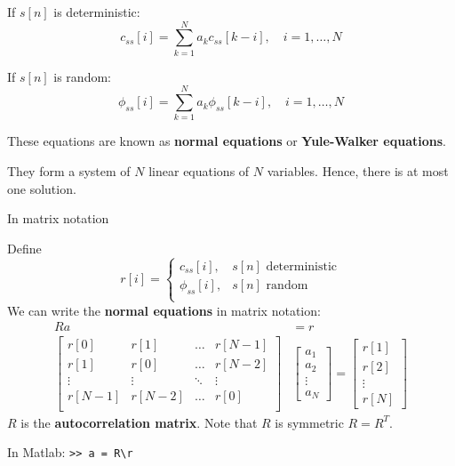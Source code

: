 \documentclass[10pt, aspectratio=169]{beamer}
\begin{document}
\begin{frame}
	If $s[n]$ is deterministic:
	\begin{equation*}
		c_{ss}[i] = \sum_{k = 1}^N a_kc_{ss}[k-i],  \quad i = 1, \ldots,N
	\end{equation*}
	
	
	If $s[n]$ is random: 
	\begin{equation*}
	\phi_{ss}[i] = \sum_{k = 1}^N a_k\phi_{ss}[k-i], \quad i = 1, \ldots,N
	\end{equation*}
	
	These equations are known as \textbf{normal equations} or \textbf{Yule-Walker equations}.
	
	\vspace{0.25cm}
	They form a system of $N$ linear equations of $N$ variables. Hence, there is at most one solution.
\end{frame}

\begin{frame}{In matrix notation}

Define
\begin{equation*}
	r[i] = \begin{cases}
	c_{ss}[i], & \text{$s[n]$ deterministic} \\
	\phi_{ss}[i], & \text{$s[n]$ random} \\
	\end{cases}
\end{equation*}
We can write the \textbf{normal equations} in matrix notation:
\begin{align*}
	Ra &= r \\
	\begin{bmatrix}
	r[0] & r[1] & \ldots & r[N-1] \\
	r[1] & r[0] & \ldots & r[N-2] \\
	\vdots & \vdots & \ddots & \vdots \\
	r[N-1] & r[N-2] & \ldots & r[0] \\
	\end{bmatrix}&\begin{bmatrix}
	a_1 \\
	a_2 \\
	\vdots \\
	a_N
	\end{bmatrix} = \begin{bmatrix}
	r[1] \\
	r[2] \\
	\vdots \\
	r[N]
	\end{bmatrix}
\end{align*}
$R$ is the \textbf{autocorrelation matrix}. Note that $R$ is symmetric $R = R^T$.

\vspace{0.5cm}
In Matlab: \texttt{>> a = R\textbackslash r}
\end{frame}
\end{document}

